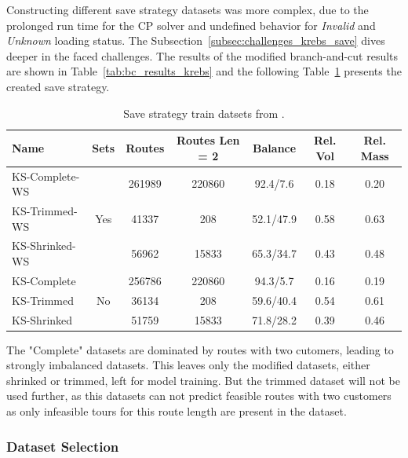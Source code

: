 Constructing different save strategy datasets was more complex, due to the prolonged run time for the \gls{CP} solver
and undefined behavior for \textit{Invalid} and \textit{Unknown} loading status. The Subsection~\ref{subsec:challenges_krebs_save}
dives deeper in the faced challenges. The results of the modified branch-and-cut results are shown in Table~\ref{tab:bc_results_krebs} and
the following Table~\ref{tab:saved_instances_krebs} presents the created save strategy.
\begin{table}[ht]
    \centering
    \begin{tabular}{l c c c c c c }
        \toprule
        Name           & Sets                 & Routes & Routes Len = 2 & Balance   & Rel. Vol & Rel. Mass \\
        \midrule
        KS-Complete-WS & \multirow{3}{*}{Yes} & 261989 & 220860         & 92.4/7.6  & 0.18     & 0.20      \\
        KS-Trimmed-WS  &                      & 41337  & 208            & 52.1/47.9 & 0.58     & 0.63      \\
        KS-Shrinked-WS &                      & 56962  & 15833          & 65.3/34.7 & 0.43     & 0.48      \\        \midrule
        KS-Complete    & \multirow{3}{*}{No}  & 256786 & 220860         & 94.3/5.7  & 0.16     & 0.19      \\
        KS-Trimmed     &                      & 36134  & 208            & 59.6/40.4 & 0.54     & 0.61      \\
        KS-Shrinked    &                      & 51759  & 15833          & 71.8/28.2 & 0.39     & 0.46      \\

        \bottomrule
    \end{tabular}
    \caption{Save strategy train datsets from \krebsADataSet.}
    \label{tab:saved_instances_krebs}
\end{table}

The "Complete" datasets are dominated by routes with two cutomers, leading to strongly imbalanced datasets. This leaves only
the modified datasets, either shrinked or trimmed, left for model training. But the trimmed dataset will not be used further,
as this datasets can not predict feasible routes with two customers as only infeasible tours for this route length are
present in the dataset.

\subsubsection{Dataset Selection}

